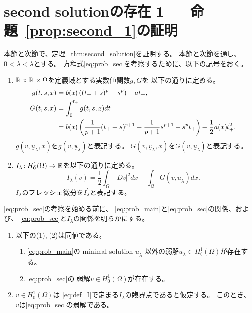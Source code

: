 \section{second solutionの存在 1 --- 命題~\ref{prop:second_1}の証明}

本節と次節で、定理~\ref{thm:second_solution}を証明する。
本節と次節を通し、$0 < \lambda < \bar{\lambda}$とする。
方程式\ref{eq:prob_sec}を考察するために、以下の記号をおく。

\begin{nota}
 \begin{enumerate}[1.]
  \item $\mathbb{R} \times \mathbb{R} \times \Omega$を定義域とする実数値関数$g, G$を
        以下の通りに定める。
        \begin{align}
         g(t, s, x) &= b(x) \left( (t_+ + s)^p - s^p \right) - a t_+, 
         \label{eq:def_g} \\
         G(t, s, x) &= \int_0^{t_+} g(t, s, x) dt
         \notag \\
         &= b(x) \left( \frac{1}{p+1} (t_+ + s)^{p+1} - \frac{1}{p+1}
         s^{p+1} - s^p t_+ \right) - \frac{1}{2} a(x) t_+^2.
         \label{eq:def_G}
        \end{align}
        $g(v, \underline{u}_\lambda, x)$を$g(v, \underline{u}_\lambda
        )$と表記する。
        $G(v,\underline{u}_\lambda, x)$を$G(v, \underline{u}_\lambda
        )$と表記する。
  \item $I_{\lambda} \colon H_0^1(\Omega) \to \mathbb{R}$を以下の通りに定める。
        \begin{equation}
         I_\lambda (v) = \frac{1}{2} \int_\Omega \lvert Dv \rvert^2 dx
          - \int_\Omega G(v, \underline{u}_\lambda) dx. \label{eq:def_I}
        \end{equation}
        $I_\lambda$のフレッシェ微分を$I_\lambda^\prime$と表記する。
 \end{enumerate}
\end{nota}

\ref{eq:prob_sec}の考察を始める前に、
\ref{eq:prob_main}と\ref{eq:prob_sec}の関係、および、
\ref{eq:prob_sec}と$I_\lambda$の関係を明らかにする。

\begin{lem}
 \begin{enumerate}[1.]
  \item 以下の(1), (2)は同値である。
        \begin{enumerate}[(1)]
         \item \ref{eq:prob_main}の minimal solution $\underline{u}_\lambda$
               以外の弱解$\bar{u}_\lambda \in H_0^1(\Omega)$が存在する。
         \item \ref{eq:prob_sec}の
               弱解$v \in H_0^1(\Omega)$が存在する。
        \end{enumerate}
  \item $v \in H_0^1(\Omega)$は
        \eqref{eq:def_I}で定まる$I_\lambda$の臨界点であると仮定する。
        このとき、$v$は\ref{eq:prob_sec}の弱解である。
 \end{enumerate}
\end{lem}

